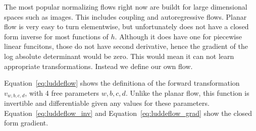 \documentclass[twoside]{article}
\begin{document}


The most popular normalizing flows right now are buildt for large dimensional
spaces such as images. This includes coupling and autoregressive flows. Planar
flow is very easy to turn elementwise, but unfortunately does not have a closed
form inverse for most functions of \(h\). Although it does have one for
piecewise linear funcitons, those do not have second derivative, hence the
gradient of the log absolute determinant would be zero. This would mean it can
not learn appropriate transformations. Instead we define our own flow.

Equation~\ref{eq:luddeflow} shows the definitiona of the forward transformation
\(v_{w, b, c, d}\), with 4 free parameters \(w, b, c, d\). Unlike the planar
flow, this function is invertible and differentiable given any values for these
parameters. Equation~\ref{eq:luddeflow_inv} and
Equation~\ref{eq:luddeflow_grad} show the closed form gradient.


\end{document}
